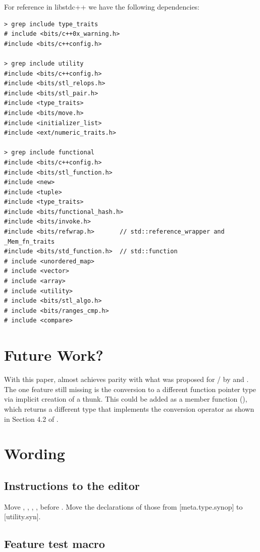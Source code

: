 For reference in libstdc++ we have the following dependencies:
\medskip\begin{lstlisting}
> grep include type_traits
# include <bits/c++0x_warning.h>
#include <bits/c++config.h>

> grep include utility
#include <bits/c++config.h>
#include <bits/stl_relops.h>
#include <bits/stl_pair.h>
#include <type_traits>
#include <bits/move.h>
#include <initializer_list>
#include <ext/numeric_traits.h>

> grep include functional
#include <bits/c++config.h>
#include <bits/stl_function.h>
#include <new>
#include <tuple>
#include <type_traits>
#include <bits/functional_hash.h>
#include <bits/invoke.h>
#include <bits/refwrap.h>       // std::reference_wrapper and _Mem_fn_traits
#include <bits/std_function.h>  // std::function
# include <unordered_map>
# include <vector>
# include <array>
# include <utility>
# include <bits/stl_algo.h>
# include <bits/ranges_cmp.h>
# include <compare>
\end{lstlisting}

\section{Future Work?}

With this paper,  almost achieves parity with what was proposed for
 /  by \textcite{P3774R0} and \textcite{P3843R2}.
The one feature still missing is the conversion to a different function pointer type via implicit
creation of a thunk.
This could be added as a member function (), which returns a different type that
implements the conversion operator as shown in Section 4.2 of \cite{P3774R0}.


\section{Wording}
\subsection{Instructions to the editor}

Move , , , ,
 before .
Move the declarations of those from [meta.type.synop] to [utility.syn].

\subsection{Feature test macro}

